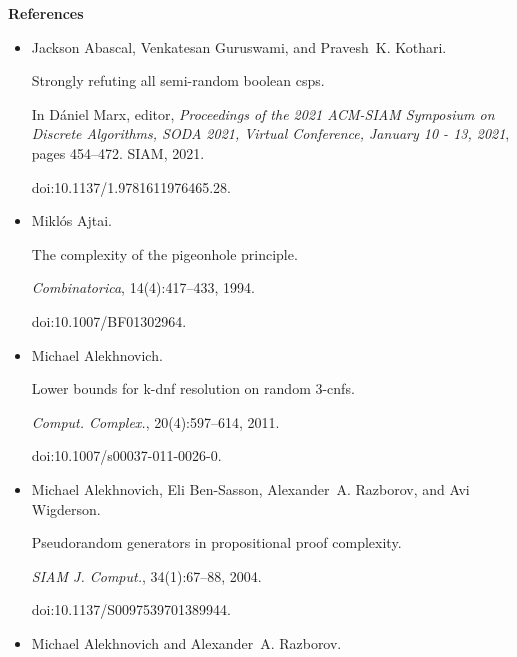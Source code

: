 \par\medskip\noindent\textbf{References}\par



\begin{itemize}


\item[] 
[1]

Jackson Abascal, Venkatesan Guruswami, and Pravesh K. Kothari.


Strongly refuting all semi-random boolean csps.


In Dániel Marx, editor, \emph{Proceedings of the 2021 ACM-SIAM
Symposium on Discrete Algorithms, SODA 2021, Virtual Conference, January 10
- 13, 2021}, pages 454–472. SIAM, 2021.


doi:10.1137/1.9781611976465.28.





\item[] 
[2]

Miklós Ajtai.


The complexity of the pigeonhole principle.


\emph{Combinatorica}, 14(4):417–433, 1994.


doi:10.1007/BF01302964.





\item[] 
[3]

Michael Alekhnovich.


Lower bounds for k-dnf resolution on random 3-cnfs.


\emph{Comput. Complex.}, 20(4):597–614, 2011.


doi:10.1007/s00037-011-0026-0.





\item[] 
[4]

Michael Alekhnovich, Eli Ben-Sasson, Alexander A. Razborov, and Avi Wigderson.


Pseudorandom generators in propositional proof complexity.


\emph{SIAM J. Comput.}, 34(1):67–88, 2004.


doi:10.1137/S0097539701389944.





\item[] 
[5]

Michael Alekhnovich and Alexander A. Razborov.



\end{itemize}
